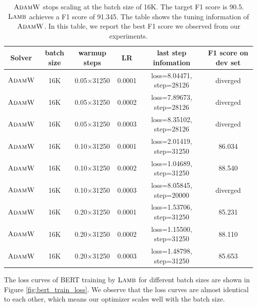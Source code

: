 \begin{table}[ht]
\renewcommand{\arraystretch}{1.3}
\caption{ $\textsc{AdamW}$ stops scaling at the batch size of 16K. The target F1 score is 90.5. $\textsc{Lamb}$ achieves a F1 score of 91.345. The table shows the tuning information of $\textsc{AdamW}$. In this table, we report the best F1 score we observed from our experiments.}
\centering
\begin{tabular}{|c|c|c|c|c|c|}
\hline
Solver & batch size & warmup steps & LR & last step infomation & F1 score on dev set\\
\hline
\hline
$\textsc{AdamW}$ & 16K & 0.05$\times$31250 & 0.0001 & loss=8.04471, step=28126 & diverged\\
\hline
$\textsc{AdamW}$ & 16K & 0.05$\times$31250 & 0.0002 & loss=7.89673, step=28126 & diverged\\
\hline
$\textsc{AdamW}$ & 16K & 0.05$\times$31250 & 0.0003 & loss=8.35102, step=28126 & diverged\\
\hline
$\textsc{AdamW}$ & 16K & 0.10$\times$31250 & 0.0001 & loss=2.01419, step=31250 & 86.034 \\
\hline
$\textsc{AdamW}$ & 16K & 0.10$\times$31250 & 0.0002 & loss=1.04689, step=31250 & 88.540 \\
\hline
$\textsc{AdamW}$ & 16K & 0.10$\times$31250 & 0.0003 & loss=8.05845, step=20000 & diverged \\
\hline
$\textsc{AdamW}$ & 16K & 0.20$\times$31250 & 0.0001 & loss=1.53706, step=31250 & 85.231 \\
\hline
$\textsc{AdamW}$ & 16K & 0.20$\times$31250 & 0.0002 & loss=1.15500, step=31250 & 88.110 \\
\hline
$\textsc{AdamW}$ & 16K & 0.20$\times$31250 & 0.0003 & loss=1.48798, step=31250 & 85.653 \\
\hline
\end{tabular}
\label{table:adamw_16k}
\end{table}

The loss curves of BERT training by $\textsc{Lamb}$ for different batch sizes are shown in Figure \ref{fig:bert_train_loss}.
We observe that the loss curves are almost identical to each other, which means our optimizer scales well with the batch size. 

